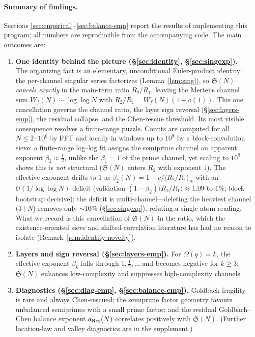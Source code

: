 \documentclass[]{interact}%
\newcommand{\OmegaF}{\Omega}
\newcommand{\sing}{\mathfrak S}
\begin{document}
\paragraph{Summary of findings.}
Sections \ref{sec:empirical}--\ref{sec:balance-emp} report the results of implementing this program; all numbers are reproducible from the accompanying code. The main outcomes are:
\begin{enumerate}[leftmargin=2em,itemsep=2pt]
\item \textbf{One identity behind the picture (\S\ref{sec:identity}, \S\ref{sec:singexp}).} The organizing fact is an elementary, unconditional Euler-product identity: the per-channel singular series factorizes (Lemma~\ref{lem:sing}), so $\sing(N)$ \emph{cancels exactly} in the main-term ratio $R_2/R_1$, leaving the Mertens channel sum $W_f(N)\sim\log\log N$ with $R_2/R_1=W_f(N)(1+o(1))$. This one cancellation governs the channel ratio, the layer sign reversal (\S\ref{sec:layers-emp}), the residual collapse, and the Chen-rescue threshold. Its most visible consequence resolves a finite-range puzzle. Counts are computed for all $N\le2\cdot10^{6}$ by FFT and locally in windows up to $10^{9}$ by a block-convolution sieve: a finite-range log--log fit assigns the semiprime channel an apparent exponent $\beta_2\approx\tfrac12$, unlike the $\beta_1=1$ of the prime channel, yet scaling to $10^{9}$ shows this is \emph{not} structural ($\sing(N)$ enters $R_2$ with exponent $1$). The effective exponent drifts to $1$ as $\beta_2(N)=1-c/\langle R_2/R_1\rangle_N$ with an $\mathcal O(1/\log\log N)$ deficit (validation $(1-\beta_2)\langle R_2/R_1\rangle\approx1.09$ to $1\%$; block bootstrap decisive); the deficit is multi-channel---deleting the heaviest channel ($3\mid N$) removes only $\sim10\%$ (\S\ref{sec:singexp}), refuting a single-atom reading. What we record is this cancellation of $\sing(N)$ in the ratio, which the existence-oriented sieve and shifted-correlation literature has had no reason to isolate (Remark~\ref{rem:identity-novelty}).
\item \textbf{Layers and sign reversal (\S\ref{sec:layers-emp}).} For $\OmegaF(q)=k$, the effective exponent $\beta_k$ falls through $1,\tfrac12,\dots$ and becomes negative for $k\ge3$: $\sing(N)$ enhances low-complexity and suppresses high-complexity channels.
\item \textbf{Diagnostics (\S\ref{sec:diag-emp}, \S\ref{sec:balance-emp}).} Goldbach fragility is rare and always Chen-rescued; the semiprime factor geometry favours unbalanced semiprimes with a small prime factor; and the residual Goldbach--Chen balance exponent $a_{\rm Res}(N)$ correlates positively with $\sing(N)$. (Further location-law and valley diagnostics are in the supplement.)

\end{enumerate}
\end{document}
